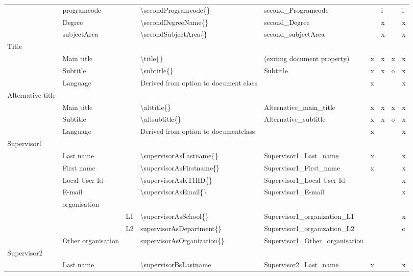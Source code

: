 \begin{landscape}
{\begin{longtable}{L{2cm}|L{4cm}|l|L{4cm}|L{4cm}|l l l l|}
& programcode &  & \textbackslash secondProgramcode\{\} & second\_Programcode &  & i &  & i \\
& Degree &  & \textbackslash secondDegreeName\{\} & second\_Degree &  & x &  & x \\
& subjectArea &  & \textbackslash secondSubjectArea\{\} & second\_subjectArea &  & x &  & x \\
       \hline
Title & \\
 & Main title &  & \textbackslash title\{\} & (exiting document property) & x & x & x & x \\
 & Subtitle &  & \textbackslash subtitle\{\} & Subtitle & x & x & o & x \\
 & Language &  & Derived from option to document class &  & x &  &  & x \\
Alternative title & \\
 & Main title &  & \textbackslash alttitle\{\} & Alternative\_main\_title & x & x & x & x \\
 & Subtitle &  & \textbackslash altsubtitle\{\} & Alternative\_subtitle & x & x & o & x \\
 & Language &  & Derived from option to documentclass &  & x &  &  & x \\
      \hline
Supervisor1 & \\
 & Last name &  & \textbackslash supervisorAsLastname\{\} & Supervisor1\_Last\_name & x &  &  & x \\
 & First name &  & \textbackslash supervisorAsFirstname\{\} & Supervisor1\_First\_name & x &  &  & x \\
 & Local User Id &  & \textbackslash supervisorAsKTHID\{\} & Supervisor1\_Local User Id &  &  &  & x \\
 & E-mail &  & \textbackslash supervisorAsEmail\{\} & Supervisor1\_E-mail &  &  &  & x \\
 & organisation & \\
 &  & L1 & \textbackslash supervisorAsSchool\{\} & Supervisor1\_organization\_L1 &  &  &  & x \\
 &  & L2 & supervisorAsDepartment\{\} & Supervisor1\_organization\_L2 &  &  &  & o \\
 & Other organisation &  & supervisorAsOrganization\{\} & Supervisor1\_Other\_organisation &  &  &  &  \\
Supervisor2 &  \\
 & Last name &  & \textbackslash supervisorBsLastname{ } & Supervisor2\_Last\_name & x &  &  & x \\

\end{longtable}}
\end{landscape}
